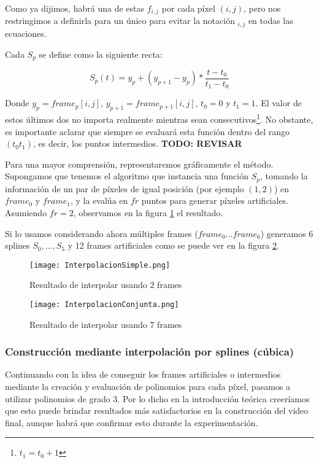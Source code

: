 Como ya dijimos, habrá una de estas $f_{i,j}$ por cada píxel $(i,j)$, pero nos restringimos a definirla para un único para evitar la notación $_{i,j}$ en todas las ecuaciones.

Cada $S_p$ se define como la siguiente recta:

$$S_p(t) = y_p + (y_{p+1} - y_p) * \frac{t - t_0}{t_1 - t_0}$$

Donde $y_{p} = frame_p[i,j]$, $y_{p+1} = frame_{p+1}[i,j]$, $t_0=0$ y $t_1=1$. El valor de estos \'ultimos dos no importa realmente mientras sean consecutivos\footnote{$t_1 = t_0 + 1$}. No obstante, es importante aclarar que siempre se evaluar\'a esta funci\'on dentro del rango $(t_0 t_1)$, es decir, los puntos intermedios. \textbf{TODO: REVISAR}

Para una mayor comprensi\'on, representaremos gr\'aficamente el método. Supongamos que tenemos el algoritmo que instancia una funci\'on $S_{p}$, tomando la información de un par de p\'ixeles de igual posici\'on (por ejemplo $(1,2)$) en $frame_0$ y $frame_1$, y la evalúa en $fr$ puntos para generar píxeles artificiales. Asumiendo $fr = 2$, observamos en la figura \ref{fig:intSimple} el resultado.

Si lo usamos considerando ahora múltiples frames ($frame_0 \ldots frame_6$) generamos 6 splines $S_0, \ldots, S_5$ y 12 frames artificiales como se puede ver en la figura \ref{fig:intConjunta}.

\begin{figure}[h!]
  \centering
    \texttt{[image: InterpolacionSimple.png]}
     \caption{Resultado de interpolar usando 2 frames}\label{fig:intSimple}
\end{figure}
\noindent

\begin{figure}[h!]
  \centering
    \texttt{[image: InterpolacionConjunta.png]}
     \caption{Resultado de interpolar usando 7 frames}\label{fig:intConjunta}
\end{figure}
\noindent

\subsubsection{Construcción mediante interpolación por splines (c\'ubica)}

Continuando con la idea de conseguir los frames artificiales o intermedios mediante la creación y evaluación de polinomios para cada píxel, pasamos a utilizar polinomios de grado 3. Por lo dicho en la introducción teórica creeríamos que esto puede brindar resultados m\'as satisfactorios en la construcci\'on del video final, aunque habr\'a que confirmar esto durante la experimentaci\'on.

